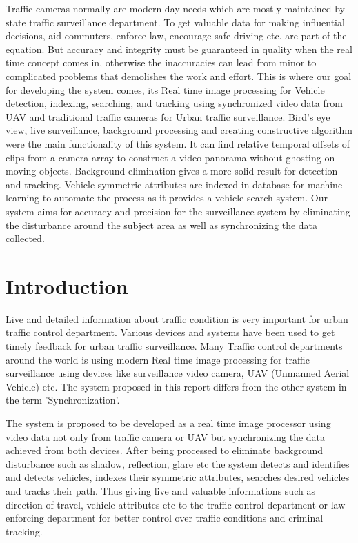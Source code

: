 \documentclass[12pt,a4paper,oneside]{article}
\begin{document}
Traffic cameras normally are modern day needs which are mostly maintained by state traffic surveillance department. To get valuable data for making influential decisions, aid commuters, enforce law, encourage safe driving etc. are part of the equation. But accuracy and integrity must be guaranteed in quality when the real time concept comes in, otherwise the inaccuracies can lead from minor to complicated problems that demolishes the work and effort. This is where our goal for developing the system comes, its Real time image processing for Vehicle detection, indexing, searching, and tracking using synchronized video data from UAV and traditional traffic cameras for Urban traffic surveillance. Bird’s eye view, live surveillance, background processing and creating constructive algorithm were the main functionality of this system. It can find relative temporal offsets of clips from a camera array to construct a video panorama without ghosting on moving objects. Background elimination gives a more solid result for detection and tracking. Vehicle symmetric attributes are indexed in database for machine learning to automate the process as it provides a vehicle search system. Our system aims for accuracy and precision for the surveillance system by eliminating the disturbance around the subject area as well as synchronizing the data collected.


\newpage
\section{Introduction}

Live and detailed information about traffic condition is very important for urban traffic control department. Various devices and systems have been used to get timely feedback for urban traffic surveillance. Many Traffic control departments around the world is using modern Real time image processing for traffic surveillance using devices like surveillance video camera, UAV (Unmanned Aerial Vehicle) etc. The system proposed in this report differs from the other system in the term 'Synchronization'. 

The system is proposed to be developed as a real time image processor using video data not only from traffic camera or UAV but synchronizing the data achieved from both devices. After being processed to eliminate background disturbance such as shadow, reflection, glare etc the system detects and identifies and detects vehicles, indexes their symmetric attributes, searches desired vehicles and tracks their path. Thus giving live and valuable informations such as direction of travel, vehicle attributes etc to the traffic control department or law enforcing department for better control over traffic conditions and criminal tracking.   
\end{document}
